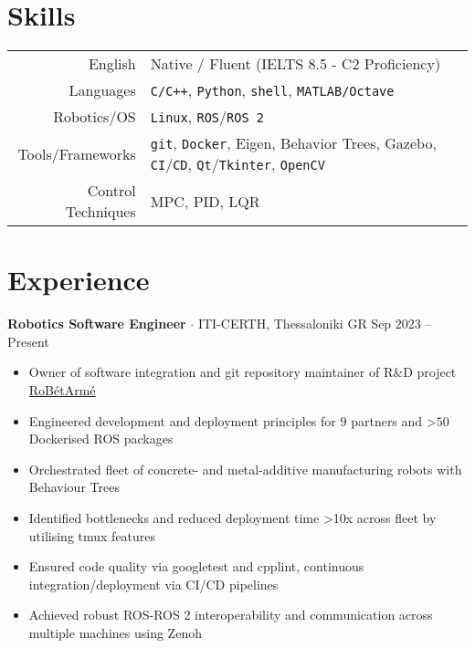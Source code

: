 \documentclass[a4paper,10pt,twoside]{article}
\begin{document}
\section{\textbf{Skills}}\verticalspacebetweensectionandcontent

\begin{center}
\begin{tabular}{rl}
English & Native / Fluent (IELTS 8.5 - C2 Proficiency) \\
Languages & \texttt{C/C++}, \texttt{Python}, \texttt{shell}, \texttt{MATLAB/Octave} \\
Robotics/OS & \texttt{Linux},  \texttt{ROS}/\texttt{ROS 2} \\
Tools/Frameworks & \texttt{git}, \texttt{Docker}, Eigen, Behavior Trees, Gazebo, \texttt{CI}/\texttt{CD}, \texttt{Qt}/\texttt{Tkinter}, \texttt{OpenCV} \\
Control Techniques & MPC, PID, LQR
\end{tabular}
\end{center}
\verticalspacebetweensections

\section{\textbf{Experience}}\verticalspacebetweensectionandcontent

  \noindent\textbf{Robotics Software Engineer} $\cdot$ ITI-CERTH, Thessaloniki GR \hfill {\small \textcolor{agray}{Sep $2023$ -- Present}} \\
  \begin{minipage}[t]{\textwidth}
    \begin{itemize}
      \item Owner of software integration and git repository maintainer of R\&D project \href{https://www.robetarme-project.eu/sobre/}{RoBétArmé}\verticalspaceafteritem
      \item Engineered development and deployment principles for $9$ partners and >$50$ Dockerised ROS packages\verticalspaceafteritem
      \item Orchestrated fleet of concrete- and metal-additive manufacturing robots with Behaviour Trees\verticalspaceafteritem
      \item Identified bottlenecks and reduced deployment time >10x across fleet by utilising tmux features \verticalspaceafteritem
      \item Ensured code quality via googletest and cpplint, continuous integration/deployment via CI/CD pipelines\verticalspaceafteritem
      \item Achieved robust ROS-ROS 2 interoperability and communication across multiple machines using Zenoh
    \end{itemize}
  \end{minipage} \\[0.2em]
\end{document}
